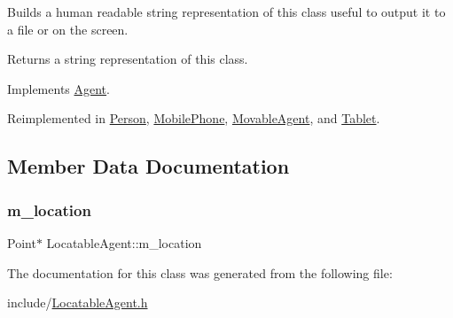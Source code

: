 Builds a human readable string representation of this class useful to output it to a file or on the screen. \begin{DoxyReturn}{Returns}
a string representation of this class. 
\end{DoxyReturn}


Implements \mbox{\hyperlink{class_agent_a44f291596d10c7878b0641d6ec156328}{Agent}}.



Reimplemented in \mbox{\hyperlink{class_person_a68872538da519d0a04297f43376db27c}{Person}}, \mbox{\hyperlink{class_mobile_phone_a2b7e556d12a43e380786ad0eccf3ce04}{Mobile\+Phone}}, \mbox{\hyperlink{class_movable_agent_a1dee2a6bf93f01006fadfb6fba6c9a59}{Movable\+Agent}}, and \mbox{\hyperlink{class_tablet_a3fae01e7d526699476221c6a686a4fba}{Tablet}}.



\subsection{Member Data Documentation}
\mbox{\label{class_locatable_agent_a2a76ba315733ab26f19229a71071704d}} 
\subsubsection{\texorpdfstring{m\_location}{m\_location}}
{\footnotesize\ttfamily Point$\ast$ Locatable\+Agent\+::m\+\_\+location\hspace{0.3cm}{\ttfamily [private]}}



The documentation for this class was generated from the following file\+:\begin{DoxyCompactItemize}
\item 
include/\mbox{\hyperlink{_locatable_agent_8h}{Locatable\+Agent.\+h}}\end{DoxyCompactItemize}

